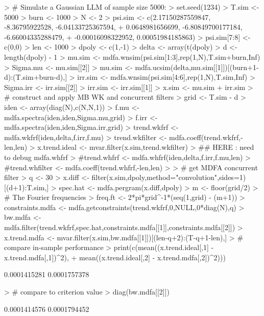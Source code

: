 \documentclass[a4paper]{book}
\begin{document}
\begin{Schunk}
\begin{Sinput}
> # Simulate a Gaussian LLM  of sample size 5000:
> set.seed(1234)
> T.sim <- 5000
> burn <- 1000
> N <- 2
> psi.sim <- c(2.17150287559847, -8.36795922528, -6.04133725367594, 
+              0.0648981656699, -6.80849700177184, -6.66004335288479, 
+              -0.00016098322952, 0.00051984185863)
> psi.sim[7:8] <- c(0,0)
> len <- 1000
> dpoly <- c(1,-1)
> delta <- array(t(dpoly) %
> d <- length(dpoly) - 1
> mu.sim <- mdfa.wnsim(psi.sim[1:3],rep(1,N),T.sim+burn,Inf)
> Sigma.mu <- mu.sim[[2]]
> mu.sim <- mdfa.ucsim(delta,mu.sim[[1]])[(burn+1-d):(T.sim+burn-d),]
> irr.sim <- mdfa.wnsim(psi.sim[4:6],rep(1,N),T.sim,Inf)
> Sigma.irr <- irr.sim[[2]]
> irr.sim <- irr.sim[[1]] 
> x.sim <- mu.sim + irr.sim
> # construct and apply MB WK  and concurrent filters
> grid <- T.sim - d
> iden <- array(diag(N),c(N,N,1))
> f.mu <- mdfa.spectra(iden,iden,Sigma.mu,grid)
> f.irr <- mdfa.spectra(iden,iden,Sigma.irr,grid)
> trend.wkfrf <- mdfa.wkfrf(iden,delta,f.irr,f.mu)
> trend.wkfilter <- mdfa.coeff(trend.wkfrf,-len,len)
> x.trend.ideal <- mvar.filter(x.sim,trend.wkfilter)
> ## HERE :  need to debug mdfa.whfrf
> #trend.whfrf <- mdfa.whfrf(iden,delta,f.irr,f.mu,len)
> #trend.whfilter <- mdfa.coeff(trend.whfrf,-len,len)
>  
> # get MDFA concurrent filter
> q <- 30
> x.diff <- filter(x.sim,dpoly,method="convolution",sides=1)[(d+1):T.sim,]
> spec.hat <- mdfa.pergram(x.diff,dpoly)
> m <- floor(grid/2)
> # The Fourier frequencies
> freq.ft <- 2*pi*grid^{-1}*(seq(1,grid) - (m+1))
> constraints.mdfa <- mdfa.getconstraints(trend.wkfrf,0,NULL,0*diag(N),q)
> bw.mdfa <- mdfa.filter(trend.wkfrf,spec.hat,constraints.mdfa[[1]],constraints.mdfa[[2]])
> x.trend.mdfa <- mvar.filter(x.sim,bw.mdfa[[1]])[(len-q+2):(T-q+1-len),]
> # compare in-sample performance
> print(c(mean((x.trend.ideal[,1] - x.trend.mdfa[,1])^2),
+ 	mean((x.trend.ideal[,2] - x.trend.mdfa[,2])^2)))
\end{Sinput}
\begin{Soutput}
[1] 0.0001415281 0.0001757378
\end{Soutput}
\begin{Sinput}
> # compare to criterion value
> diag(bw.mdfa[[2]])
\end{Sinput}
\begin{Soutput}
[1] 0.0001414576 0.0001794452
\end{Soutput}
\end{Schunk}
\end{document}
